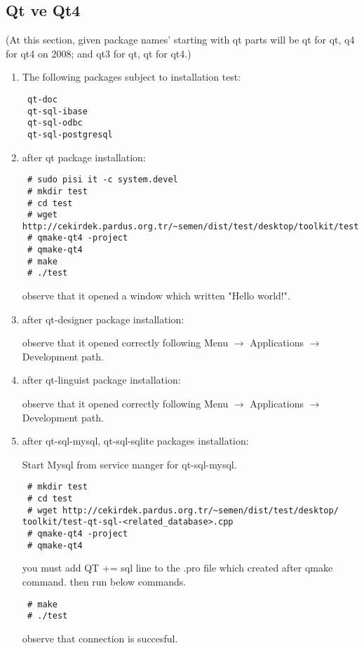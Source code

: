 \documentclass[a4paper,10pt]{article}
\begin{document}
\subsection*{Qt ve Qt4}

(At this section, given package names' starting with qt parts will be qt for qt, q4 for qt4 on 2008; and qt3 for qt, qt for qt4.)
\begin{enumerate}
\item The following packages subject to installation test:
\begin{verbatim}
 qt-doc
 qt-sql-ibase
 qt-sql-odbc
 qt-sql-postgresql
\end{verbatim}
 \item after qt package installation:

\begin{verbatim}
 # sudo pisi it -c system.devel
 # mkdir test
 # cd test
 # wget http://cekirdek.pardus.org.tr/~semen/dist/test/desktop/toolkit/test.cpp
 # qmake-qt4 -project
 # qmake-qt4
 # make
 # ./test
\end{verbatim}

observe that it opened a window which written "Hello world!".
\item after qt-designer package installation:

observe that it opened correctly following Menu $\rightarrow$ Applications $\rightarrow$ Development path.

\item after qt-linguist package installation:

observe that it opened correctly following Menu $\rightarrow$ Applications $\rightarrow$ Development path.

\item after qt-sql-mysql, qt-sql-sqlite packages installation:

Start Mysql from service manger for qt-sql-mysql.
\begin{verbatim}
 # mkdir test
 # cd test
 # wget http://cekirdek.pardus.org.tr/~semen/dist/test/desktop/ 
toolkit/test-qt-sql-<related_database>.cpp
 # qmake-qt4 -project
 # qmake-qt4	
\end{verbatim}
you must add QT += sql line to the .pro file which created after qmake command. then run below commands.
\begin{verbatim}
 # make
 # ./test
\end{verbatim}

observe that connection is succesful.

\end{enumerate}
\end{document}
